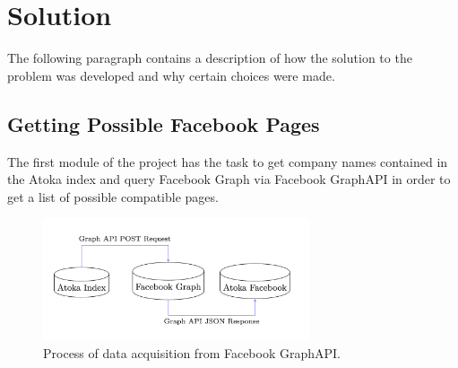\chapter{Solution} 

The following paragraph contains a description of how the solution to the problem was developed and why certain choices were made.

\section{Getting Possible Facebook Pages}

The first module of the project has the task to get company names contained in the Atoka index and query Facebook Graph via Facebook GraphAPI in order to get a list of possible compatible pages.

\begin{figure}
\centering
\includegraphics[width=0.7\textwidth]{img/atoka_fb.png}
\caption{Process of data acquisition from Facebook GraphAPI.}
\label{Fig.3}
\end{figure}

